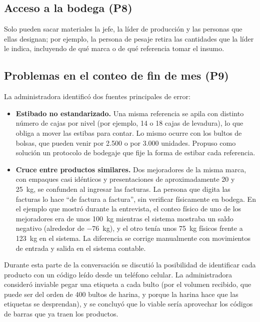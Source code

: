 \subsection{Acceso a la bodega (P8)}

Solo pueden sacar materiales la jefe, la líder de producción y las personas que ellas designan; por ejemplo, la persona de pesaje retira las cantidades que la líder le indica, incluyendo de qué marca o de qué referencia tomar el insumo.

\subsection{Problemas en el conteo de fin de mes (P9)}

La administradora identificó dos fuentes principales de error:

\begin{itemize}
    \item \textbf{Estibado no estandarizado.} Una misma referencia se apila con distinto número de cajas por nivel (por ejemplo, 14 o 18 cajas de levadura), lo que obliga a mover las estibas para contar. Lo mismo ocurre con los bultos de bolsas, que pueden venir por 2.500 o por 3.000 unidades. Propuso como solución un protocolo de bodegaje que fije la forma de estibar cada referencia.
    \item \textbf{Cruce entre productos similares.} Dos mejoradores de la misma marca, con empaques casi idénticos y presentaciones de aproximadamente 20 y 25~kg, se confunden al ingresar las facturas. La persona que digita las facturas lo hace ``de factura a factura'', sin verificar físicamente en bodega. En el ejemplo que mostró durante la entrevista, el conteo físico de uno de los mejoradores era de unos 100~kg mientras el sistema mostraba un saldo negativo (alrededor de $-76$~kg), y el otro tenía unos 75~kg físicos frente a 123~kg en el sistema. La diferencia se corrige manualmente con movimientos de entrada y salida en el sistema contable.
\end{itemize}

Durante esta parte de la conversación se discutió la posibilidad de identificar cada producto con un código leído desde un teléfono celular. La administradora consideró inviable pegar una etiqueta a cada bulto (por el volumen recibido, que puede ser del orden de 400 bultos de harina, y porque la harina hace que las etiquetas se desprendan), y se concluyó que lo viable sería aprovechar los códigos de barras que ya traen los productos.

